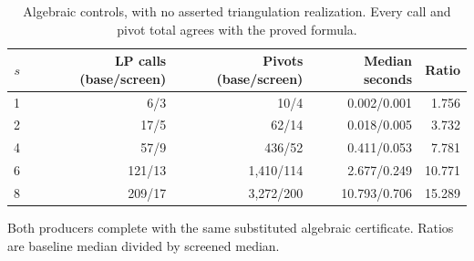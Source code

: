 \begin{table}[tbp]
\centering
\small
\setlength{\tabcolsep}{4pt}
\caption{Algebraic controls, with no asserted triangulation realization. Every call and pivot total agrees with the proved formula.}
\label{tab:lp-algebraic}
\begin{tabular}{@{}rrrrr@{}}
\toprule
$s$ & LP calls (base/screen) & Pivots (base/screen) & Median seconds & Ratio\\
\midrule
1 & 6/3 & 10/4 & 0.002/0.001 & 1.756\\
2 & 17/5 & 62/14 & 0.018/0.005 & 3.732\\
4 & 57/9 & 436/52 & 0.411/0.053 & 7.781\\
6 & 121/13 & 1,410/114 & 2.677/0.249 & 10.771\\
8 & 209/17 & 3,272/200 & 10.793/0.706 & 15.289\\
\bottomrule
\end{tabular}
\par\smallskip
\begin{minipage}{0.97\textwidth}
\footnotesize Both producers complete with the same substituted algebraic certificate. Ratios are baseline median divided by screened median.
\end{minipage}
\end{table}
